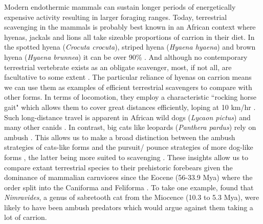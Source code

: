 \documentclass[a4paper,12pt]{article}
\begin{document}
Modern endothermic mammals can sustain longer periods of energetically expensive activity \citep{bennett1979endothermy} resulting in larger foraging ranges. 
Today, terrestrial scavenging in the mammals is probably best known in an African context where hyenas, jackals and lions all take sizeable proportions of carrion in their diet.
In the spotted hyena (\textit{Crocuta crocuta}), striped hyena (\textit{Hyaena hyaena}) and brown hyena (\textit{Hyaena brunnea}) it can be over 90\% \citep{jones2015african}.
And although no contemporary terrestrial vertebrate exists as an obligate scavenger, most, if not all, are facultative to some extent \citep{beasley2015vertebrates}.
The particular reliance of hyenas on carrion means we can use them as examples of efficient terrestrial scavengers to compare with other forms. 
In terms of locomotion, they employ a characteristic ``rocking horse gait"  which allows them to cover great distances efficiently, loping at 10 km/hr \citep{mills1989comparative,jones2015african}. 
Such long-distance travel is apparent in African wild dogs (\textit{Lycaon pictus}) and many other canids \citep{pennycuick1995radius,janis2014forelimb}. 
In contrast, big cats like leopards (\textit{Panthera pardus}) rely on ambush \citep{pennycuick1995radius}. 
This allows us to make a broad distinction between the ambush strategies of cats-like forms and the pursuit/ pounce strategies of more dog-like forms%
, the latter being more suited to scavenging \citep{janis2014forelimb}. 
These insights allow us to compare extant terrestrial species to their prehistoric forebears given the dominance of mammalian carnviores since the Eocene (56-33.9 Mya) where the order split into the Caniforma and Feliforma \citep{van1987skeletal}.
To take one example, \cite{anyonge1996locomotor} found that \textit{Nimravides}, a genus of sabretooth cat from the Miocence (10.3 to 5.3 Mya), were likely to have been ambush predators which would argue against them taking a lot of carrion. 
\end{document}
